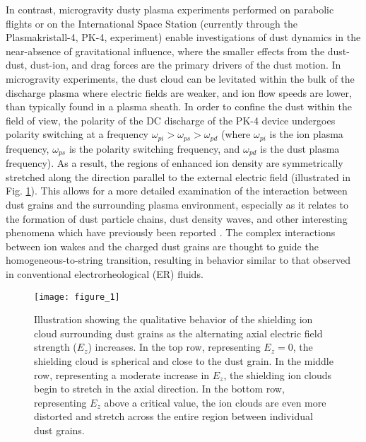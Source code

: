 \documentclass[aip,amsmath,amssymb,graphicx,floatfix,reprint]{revtex4-1}
\begin{document}
In contrast, microgravity dusty plasma experiments performed on parabolic flights \cite{Thoma2006} or on the International Space Station (currently through the Plasmakristall-4, PK-4, experiment)\cite{Fortov2005,Ivlev2011,Khrapak2016,Thoma2010,Pustylnik2016,thomas2019} enable investigations of dust dynamics in the near-absence of gravitational influence, where the smaller effects from the dust-dust, dust-ion, and drag forces are the primary drivers of the dust motion.  In microgravity experiments, the dust cloud can be levitated within the bulk of the discharge plasma where electric fields are weaker, and ion flow speeds are lower, than typically found in a plasma sheath.  In order to confine the dust within the field of view, the polarity of the DC discharge of the PK-4 device undergoes polarity switching at a frequency $\omega_{pi} >\omega_{ps} >\omega_{pd}$ (where $\omega_{pi}$ is the ion plasma frequency, $\omega_{ps}$ is the polarity switching frequency, and $\omega_{pd}$ is the dust plasma frequency). As a result, the regions of enhanced ion density are symmetrically stretched along the direction parallel to the external electric field (illustrated in Fig. \ref{fig:ioncloudcartoon}).  This allows for a more detailed examination of the interaction between dust grains and the surrounding plasma environment, especially as it relates to the formation of dust particle chains, dust density waves, and other interesting phenomena which have previously been reported \cite{Arp2012,Zobnin2018,Takahashi2019,Pustylnik2020,Dietz2021}.  The complex interactions between ion wakes and the charged dust grains are thought to guide the homogeneous-to-string transition\cite{Lipaev97,Fortov97,Melzer1996,Melzer1999}, resulting in behavior similar to that observed in conventional electrorheological (ER) fluids\cite{Ivlev2008}.

\begin{figure}
\texttt{[image: figure\_1]}
\caption{Illustration showing the qualitative behavior of the shielding ion cloud surrounding dust grains as the alternating axial electric field strength ($E_z$) increases.  In the top row, representing $E_z=0$, the shielding cloud is spherical and close to the dust grain.  In the middle row, representing a moderate increase in $E_z$, the shielding ion clouds begin to stretch in the axial direction.  In the bottom row, representing $E_z$ above a critical value, the ion clouds are even more distorted and stretch across the entire region between individual dust grains.}
\label{fig:ioncloudcartoon}
\end{figure}
\end{document}
